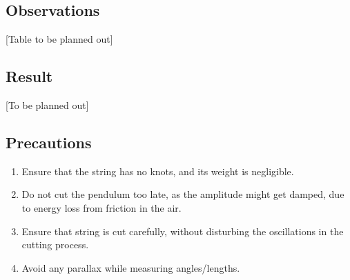\subsection{Observations}
[Table to be planned out]
\subsection{Result}
[To be planned out]
\subsection{Precautions}
\begin{enumerate}
\item Ensure that the string has no knots, and its weight is negligible.
\item Do not cut the pendulum too late, as the amplitude might get damped, due to energy loss from friction in the air.
\item Ensure that string is cut carefully, without disturbing the oscillations in the cutting process.
\item Avoid any parallax while measuring angles/lengths.
\end{enumerate}




  

                                                                           
